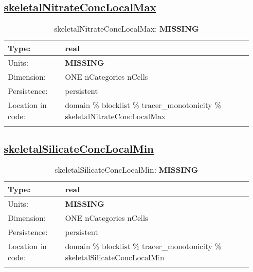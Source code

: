 \subsection[skeletalNitrateConcLocalMax]{\hyperref[sec:var_tab_tracer_monotonicity]{skeletalNitrateConcLocalMax}}
\label{subsec:var_sec_tracer_monotonicity_skeletalNitrateConcLocalMax}
\begin{center}
\begin{longtable}{| p{2.0in} | p{4.0in} |}
        \hline 
        Type: & real \\
        \hline 
        Units: & {\bf \color{red} MISSING} \\
        \hline 
        Dimension: & ONE nCategories nCells \\
        \hline 
        Persistence: & persistent \\
        \hline 
         Location in code: & domain \% blocklist \% tracer\_monotonicity \% skeletalNitrateConcLocalMax \\
         \hline 
    \caption{skeletalNitrateConcLocalMax: {\bf \color{red} MISSING}}
\end{longtable}
\end{center}
\subsection[skeletalSilicateConcLocalMin]{\hyperref[sec:var_tab_tracer_monotonicity]{skeletalSilicateConcLocalMin}}
\label{subsec:var_sec_tracer_monotonicity_skeletalSilicateConcLocalMin}
\begin{center}
\begin{longtable}{| p{2.0in} | p{4.0in} |}
        \hline 
        Type: & real \\
        \hline 
        Units: & {\bf \color{red} MISSING} \\
        \hline 
        Dimension: & ONE nCategories nCells \\
        \hline 
        Persistence: & persistent \\
        \hline 
         Location in code: & domain \% blocklist \% tracer\_monotonicity \% skeletalSilicateConcLocalMin \\
         \hline 
    \caption{skeletalSilicateConcLocalMin: {\bf \color{red} MISSING}}
\end{longtable}
\end{center}
